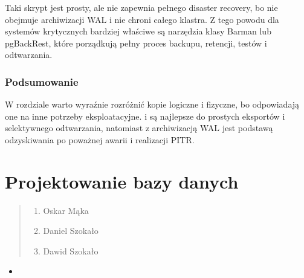 \documentclass[letterpaper,10pt,polish]{sphinxmanual}
\begin{document}
\sphinxAtStartPar
Taki skrypt jest prosty, ale nie zapewnia pełnego disaster recovery, bo nie obejmuje archiwizacji WAL i nie chroni całego klastra. Z tego powodu dla systemów krytycznych bardziej właściwe są narzędzia klasy Barman lub pgBackRest, które porządkują pełny proces backupu, retencji, testów i odtwarzania.


\subsection{Podsumowanie}
\label{\detokenize{rozdzia_u0142_2/rozdzia_u0142_28/index:podsumowanie}}
\sphinxAtStartPar
W rozdziale warto wyraźnie rozróżnić kopie logiczne i fizyczne, bo odpowiadają one na inne potrzeby eksploatacyjne.  i  są najlepsze do prostych eksportów i selektywnego odtwarzania, natomiast  z archiwizacją WAL jest podstawą odzyskiwania po poważnej awarii i realizacji PITR.

\sphinxstepscope

\sphinxstepscope


\chapter{Projektowanie bazy danych}
\label{\detokenize{rozdzia_u0142_3/BD_PlanBazyDanych_zad1/index:projektowanie-bazy-danych}}\label{\detokenize{rozdzia_u0142_3/BD_PlanBazyDanych_zad1/index::doc}}\label{\detokenize{rozdzia_u0142_3/BD_PlanBazyDanych_zad1/index::doc}}\begin{quote}\begin{description}
\begin{enumerate}
%
\item {} 
\sphinxAtStartPar
Oskar Mąka

\item {} 
\sphinxAtStartPar
Daniel Szokało

\item {} 
\sphinxAtStartPar
Dawid Szokało

\end{enumerate}

\end{description}\end{quote}
\begin{itemize}
\item {} 
\sphinxAtStartPar
{} 

\end{itemize}
\end{document}
